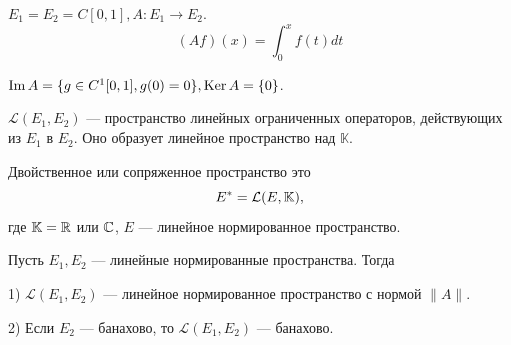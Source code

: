 \begin{example}
$E_1 = E_2 = C[0, 1], A: E_1 \to E_2$.
\[
(Af)(x) = \int_0^x f(t)dt
\]

$\operatorname{Im} A = \{g \in C^1[0, 1], g(0) = 0\}, \operatorname{Ker} A = \{0\}$.
\end{example}

\begin{definition}
$\mathcal{L}(E_1, E_2)$ --- пространство линейных ограниченных операторов, действующих из $E_1$ в $E_2$. Оно образует линейное пространство над $\mathbb{K}$.
\end{definition}

\begin{definition}
Двойственное или сопряженное пространство это
    \[E^* = \mathcal{L}(E, \mathbb{K}),\]
    где $\mathbb{K} = \mathbb{R}$ или $\mathbb{C}$, $E$ --- линейное нормированное пространство. 
\end{definition}

\begin{theorem}
Пусть $E_1, E_2$ --- линейные нормированные пространства. Тогда

1) $\mathcal{L}(E_1, E_2)$ --- линейное нормированное пространство с нормой $\|A\|$.

2) Если $E_2$ --- банахово, то $\mathcal{L}(E_1, E_2)$ --- банахово.
\end{theorem}

